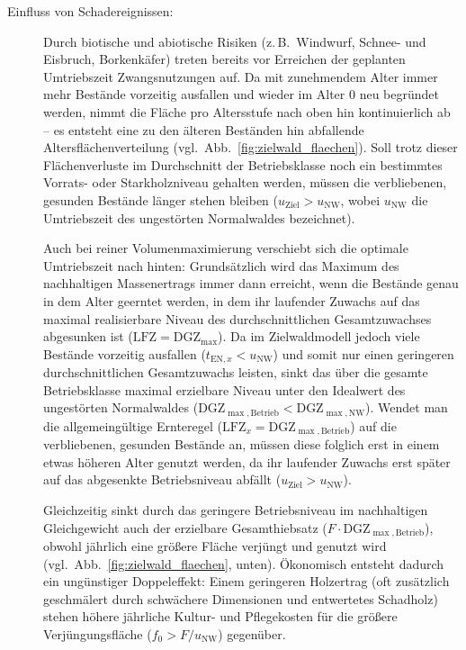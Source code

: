 \documentclass[twocolumn, paper=a4, fontsize=10pt]{scrartcl}
\begin{document}
\begin{description}
\item[Einfluss von Schadereignissen:] Durch biotische und abiotische Risiken (z.\,B.\ Windwurf, Schnee- und Eisbruch, Borkenkäfer) treten bereits vor Erreichen der geplanten Umtriebszeit Zwangsnutzungen auf. Da mit zunehmendem Alter immer mehr Bestände vorzeitig ausfallen und wieder im Alter $0$ neu begründet werden, nimmt die Fläche pro Altersstufe nach oben hin kontinuierlich ab -- es entsteht eine zu den älteren Beständen hin abfallende Altersflächenverteilung (vgl.\ Abb.~\ref{fig:zielwald_flaechen}). Soll trotz dieser Flächenverluste im Durchschnitt der Betriebsklasse noch ein bestimmtes Vorrats- oder Starkholzniveau gehalten werden, müssen die verbliebenen, gesunden Bestände länger stehen bleiben ($u_{\text{Ziel}} > u_{\text{NW}}$, wobei $u_{\text{NW}}$ die Umtriebszeit des ungestörten Normalwaldes bezeichnet).

  Auch bei reiner Volumenmaximierung verschiebt sich die optimale Umtriebszeit nach hinten: Grundsätzlich wird das Maximum des nachhaltigen Massenertrags immer dann erreicht, wenn die Bestände genau in dem Alter geerntet werden, in dem ihr laufender Zuwachs auf das maximal realisierbare Niveau des durchschnittlichen Gesamtzuwachses abgesunken ist ($\text{LFZ} = \text{DGZ}_{\max}$). Da im Zielwaldmodell jedoch viele Bestände vorzeitig ausfallen ($t_{\text{EN},x} < u_{\text{NW}}$) und somit nur einen geringeren durchschnittlichen Gesamtzuwachs leisten, sinkt das über die gesamte Betriebsklasse maximal erzielbare Niveau unter den Idealwert des ungestörten Normalwaldes ($\text{DGZ}_{\max,\text{Betrieb}} < \text{DGZ}_{\max,\text{NW}}$). Wendet man die allgemeingültige Ernteregel ($\text{LFZ}_{x} = \text{DGZ}_{\max,\text{Betrieb}}$) auf die verbliebenen, gesunden Bestände an, müssen diese folglich erst in einem etwas höheren Alter genutzt werden, da ihr laufender Zuwachs erst später auf das abgesenkte Betriebsniveau abfällt ($u_{\text{Ziel}} > u_{\text{NW}}$).

  Gleichzeitig sinkt durch das geringere Betriebsniveau im nachhaltigen Gleichgewicht auch der erzielbare Gesamthiebsatz ($F \cdot \text{DGZ}_{\max,\text{Betrieb}}$), obwohl jährlich eine größere Fläche verjüngt und genutzt wird (vgl.\ Abb.~\ref{fig:zielwald_flaechen}, unten). Ökonomisch entsteht dadurch ein ungünstiger Doppeleffekt: Einem geringeren Holzertrag (oft zusätzlich geschmälert durch schwächere Dimensionen und entwertetes Schadholz) stehen höhere jährliche Kultur- und Pflegekosten für die größere Verjüngungsfläche ($f_0 > F/u_{\text{NW}}$) gegenüber.


\end{description}
\end{document}
